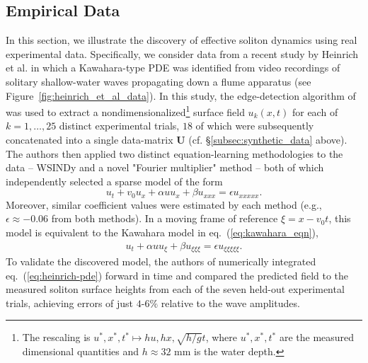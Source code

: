 \documentclass[journal=gmj]{CUP-JNL-DTM}%
\theoremstyle{definition}
\numberwithin{equation}{section}
\begin{document}
\vspace{-2.5 mm}

\subsection{Empirical Data}\label{subsec:empirical_data}
In this section, we illustrate the discovery of effective soliton dynamics using real experimental data. Specifically, we consider data from a recent study by Heinrich et al. \cite{Heinrich.etal2025, Heinrich.etal2026} in which a Kawahara-type PDE was identified from video recordings of solitary shallow-water waves propagating down a flume apparatus (see Figure~\ref{fig:heinrich_et_al_data}). In this study, the edge-detection algorithm of \cite{Canny1986IEEETransPatternAnalMachIntell} was used to extract a nondimensionalized\footnote{The rescaling is $u^*\!,x^*\!,t^* \mapsto hu, hx, \sqrt{h/g}t$, where $u^*\!,x^*\!,t^*$ are the measured dimensional quantities and $h \approx 32$ mm is the water depth.}  surface field $u_k(x,t)$ for each of $k = 1, \dots, 25$ distinct experimental trials, $18$ of which were subsequently concatenated into a single data-matrix $\mathbf{U}$ (cf. \S\ref{subsec:synthetic_data} above). The authors then applied two distinct equation-learning methodologies to the data -- WSINDy and a novel "Fourier multiplier" method \cite{Heinrich.etal2025} -- both of which independently selected a sparse model of the form \begin{equation}\label{eq:heinrich-pde}
  u_t + v_0u_x + \alpha uu_x + \beta u_{xxx} = \epsilon u_{xxxxx}.
\end{equation} Moreover, similar coefficient values were estimated by each method (e.g., $\epsilon \approx -0.06$ from both methods). In a moving frame of reference $\xi = x - v_0t$, this model is equivalent to the Kawahara model in eq.~(\ref{eq:kawahara_eqn}), \begin{align*}
    u_t + \alpha uu_{\xi} + \beta u_{\xi\xi\xi} = \epsilon u_{\xi\xi\xi\xi\xi}.
\end{align*} To validate the discovered model, the authors of \cite{Heinrich.etal2025} numerically integrated eq.~(\ref{eq:heinrich-pde}) forward in time and compared the predicted field to the measured soliton surface heights from each of the seven held-out experimental trials, achieving errors of just $4$-$6\%$ relative to the wave amplitudes.

\smallskip
\end{document}
